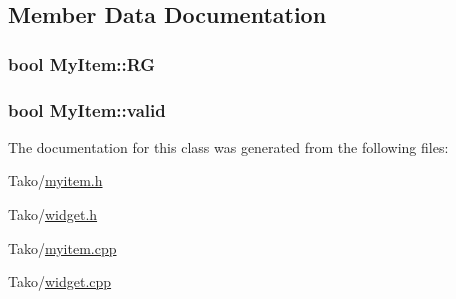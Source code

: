 \subsection{Member Data Documentation}
\subsubsection[{\texorpdfstring{RG}{RG}}]{\setlength{\rightskip}{0pt plus 5cm}bool My\+Item\+::\+RG}\hypertarget{classMyItem_a8062967505fab8ad3d54e71c04876c7f}{}\label{classMyItem_a8062967505fab8ad3d54e71c04876c7f}
\subsubsection[{\texorpdfstring{valid}{valid}}]{\setlength{\rightskip}{0pt plus 5cm}bool My\+Item\+::valid}\hypertarget{classMyItem_aaeda1d0e2b67ff57fc2206c9e8d8e5e2}{}\label{classMyItem_aaeda1d0e2b67ff57fc2206c9e8d8e5e2}


The documentation for this class was generated from the following files\+:\begin{DoxyCompactItemize}
\item 
Tako/\hyperlink{myitem_8h}{myitem.\+h}\item 
Tako/\hyperlink{widget_8h}{widget.\+h}\item 
Tako/\hyperlink{myitem_8cpp}{myitem.\+cpp}\item 
Tako/\hyperlink{widget_8cpp}{widget.\+cpp}\end{DoxyCompactItemize}

